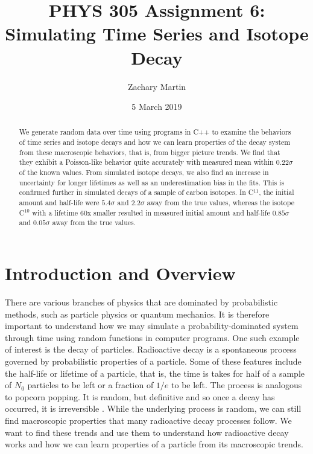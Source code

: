 \documentclass[aps,prl,twocolumn,superscriptaddress]{revtex4-1}
\begin{document}
\title{PHYS 305 Assignment 6: Simulating Time Series and Isotope Decay}
\author{Zachary Martin}
\date{5 March 2019}

\begin{abstract}
We generate random data over time using programs in C++ to examine the behaviors of time series and isotope decays and how we can learn properties of the decay system from these macroscopic behaviors, that is, from bigger picture trends. We find that they exhibit a Poisson-like behavior quite accurately with measured mean within $0.22\sigma$ of the known values. From simulated isotope decays, we also find an increase in uncertainty for longer lifetimes as well as an underestimation bias in the fits. This is confirmed further in simulated decays of a sample of carbon isotopes. In C$^{11}$, the initial amount and half-life were $5.4\sigma$ and $2.2\sigma$ away from the true values, whereas the isotope C$^{10}$ with a lifetime 60x smaller resulted in measured initial amount and half-life $0.85\sigma$ and $0.05\sigma$ away from the true values. 
\end{abstract}

\maketitle

\section{Introduction and Overview}

There are various branches of physics that are dominated by probabilistic methods, such as particle physics or quantum mechanics. It is therefore important to understand how we may simulate a probability-dominated system through time using random functions in computer programs. One such example of interest is the decay of particles. Radioactive decay is a spontaneous process governed by probabilistic properties of a particle. Some of these features include the half-life or lifetime of a particle, that is, the time is takes for half of a sample of $N_0$ particles to be left or a fraction of $1/e$ to be left. The process is analogous to popcorn popping. It is random, but definitive and so once a decay has occurred, it is irreversible \cite{decay}. While the underlying process is random, we can still find macroscopic properties that many radioactive decay processes follow. We want to find these trends and use them to understand how radioactive decay works and how we can learn properties of a particle from its macroscopic trends.
\end{document}
